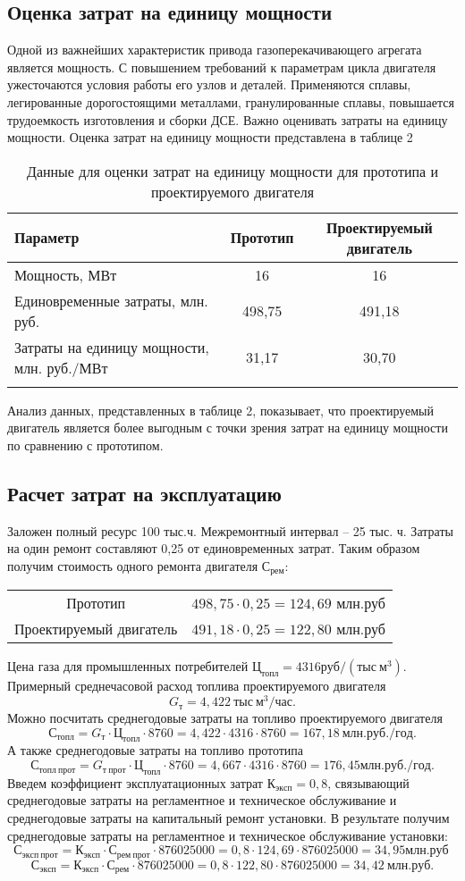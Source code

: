 \subsection{Оценка затрат на единицу мощности}
Одной из важнейших характеристик привода газоперекачивающего агрегата является мощность. С повышением требований к
параметрам цикла двигателя ужесточаются условия работы его узлов и деталей. Применяются сплавы, легированные
дорогостоящими металлами, гранулированные сплавы, повышается трудоемкость изготовления и сборки ДСЕ. Важно оценивать
затраты на единицу мощности. Оценка затрат на единицу мощности представлена в таблице 2
\begin{longtable}{|p{6cm}|c|c|}
    \hline
    \textbf{Параметр} &
    \textbf{Прототип} &
    \textbf{Проектируемый двигатель} \\\hline
    \endhead
    Мощность, МВт & 16 & 16 \\\hline
    Единовременные затраты, млн. руб. & 498,75 & 491,18 \\\hline
    Затраты на единицу мощности, млн. руб./МВт & 31,17 & 30,70 \\\hline
    \caption{Данные для оценки затрат на единицу мощности для прототипа и проектируемого двигателя} \label{tab:economics-unit-power}
    \end{longtable}
Анализ данных, представленных в таблице 2, показывает, что проектируемый двигатель является более выгодным с точки зрения
затрат на единицу мощности по сравнению с прототипом.

\subsection{Расчет затрат на эксплуатацию}
Заложен полный ресурс 100 тыс.ч. Межремонтный интервал – 25 тыс. ч. Затраты на один ремонт составляют 0,25 от единовременных затрат.
Таким образом получим стоимость одного ремонта двигателя $С_{рем}$:
\begin{longtable}{c c}
    Прототип & $498,75 \cdot 0,25=124,69$ млн.руб \\
    Проектируемый двигатель & $491,18 \cdot 0,25=122,80$ млн.руб \\
\end{longtable}
Цена газа для промышленных потребителей $Ц_{топл} = 4316 руб/(тыс \ м^3)$.
Примерный среднечасовой расход топлива проектируемого двигателя
$$
    G_т = 4,422 \ тыс \ м^3 / час.
$$
Можно посчитать среднегодовые затраты на топливо проектируемого двигателя
$$
    С_{топл}=G_т \cdot Ц_{топл} \cdot 8760 = 4,422 \cdot 4316 \cdot 8760 = 167,18 \ млн.руб./год.
$$
А также среднегодовые затраты на топливо прототипа
$$
    С_{топл \ прот} = G_{т \ прот} \cdot Ц_{топл} \cdot 8760 = 4,667 \cdot 4316 \cdot 8760 = 176,45 млн.руб./год.
$$
Введем коэффициент эксплуатационных затрат $К_{эксп} = 0,8$, связывающий среднегодовые затраты на регламентное и
техническое обслуживание и среднегодовые затраты на капитальный ремонт установки. В результате получим среднегодовые
затраты на регламентное и техническое обслуживание установки:
$$
    С_{эксп \ прот} = К_{эксп} \cdot С_{рем \ прот} \cdot 876025000 = 0,8 \cdot 124,69 \cdot 876025000 = 34,95 млн.руб \
$$
$$
    С_{эксп} = К_{эксп} \cdot С_{рем} \cdot 876025000 = 0,8 \cdot 122,80 \cdot 876025000 = 34,42 \ млн.руб.
$$

